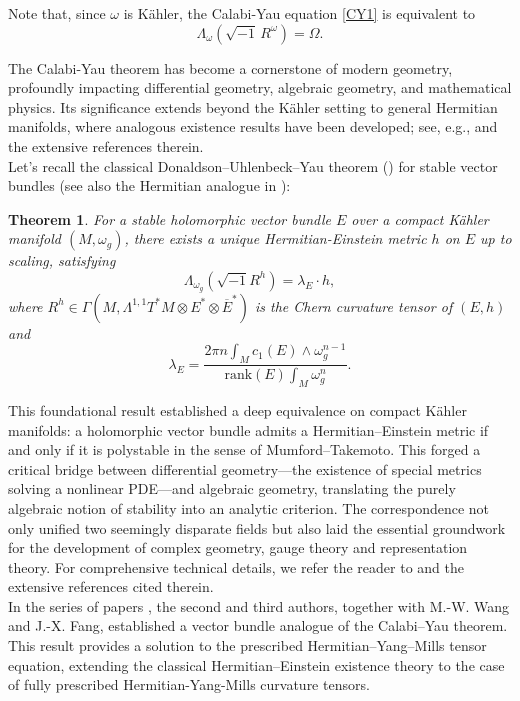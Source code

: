 \documentclass[12pt, reqno]{amsart}
\theoremstyle{plain}
\newtheorem{theorem}{Theorem}[section]
\theoremstyle{definition}
\newcommand{\sq}{\sqrt{-1}}
\renewcommand{\bar}{\overline}
\newcommand{\beq}{\begin{equation}}
\newcommand{\eeq}{\end{equation}}
\newcommand{\Om}{\Omega}
\newcommand{\ts}{\otimes}
\renewcommand{\>}{\rightarrow}
\renewcommand{\>}{\rightarrow}
\newcommand{\om}{\omega}
\renewcommand{\bar}{\overline}
\numberwithin{equation}{section} %
\begin{document}
\noindent   Note  that, since $\omega$ is K\"ahler, the Calabi-Yau equation \eqref{CY1} is equivalent to
\beq \Lambda_{\om}\left(\sqrt{-1}\, R^{\omega}\right) =\Om.\label{CY}\eeq

    \noindent The Calabi-Yau theorem  has become a cornerstone of modern geometry, profoundly impacting differential geometry, algebraic geometry, and mathematical physics. Its significance extends beyond the K\"ahler setting to general Hermitian manifolds, where analogous existence results have been developed; see, e.g., \cite{FY08, TW10, STW17} and the extensive references therein.  \\

  Let's recall the classical Donaldson--Uhlenbeck--Yau theorem (\cite{Don85, UY86, Don87}) for stable vector bundles (see also the Hermitian analogue in \cite{LY86}):  \begin{theorem}  For  a stable holomorphic vector bundle $E$ over a compact K\"ahler manifold $(M,\omega_g)$,  there exists a unique Hermitian-Einstein metric $h$ on $E$ up to scaling, satisfying
    \beq \Lambda_{\omega_g} \left(\sq R^h\right)=\lambda_E\cdot h, \label{HE} \eeq
    where $R^h\in\Gamma(M,\Lambda^{1,1}T^*M\ts E^*\ts \bar E^*)$ is the Chern curvature tensor of $(E,h)$ and
    $$\lambda_E=\frac{2\pi n\int_M c_1(E)\wedge \omega_g^{n-1}}{\mathrm{rank}(E)\int_M\omega_g^n}.$$ \end{theorem}

\noindent This foundational result established a deep equivalence on compact K\"ahler manifolds: a holomorphic vector bundle admits a Hermitian--Einstein metric if and only if it is polystable in the sense of Mumford--Takemoto. This forged a critical bridge between differential geometry---the existence of special metrics solving a nonlinear PDE---and algebraic geometry, translating the purely algebraic notion of stability into an analytic criterion. The correspondence not only unified two seemingly disparate fields but also laid the essential groundwork for the development of complex geometry, gauge theory and representation theory.  For comprehensive technical details, we refer the reader to \cite{NS65, Hit87, Sim88, Sim92} and the extensive references cited therein.\\



In the series of papers \cite{WYY26+,FWYY26+,WYY26b+}, the second and third authors, together with M.-W. Wang and J.-X. Fang, established a vector bundle analogue of the Calabi--Yau theorem. This result provides a solution to the prescribed Hermitian--Yang--Mills tensor equation, extending the classical Hermitian--Einstein existence theory to the case of fully prescribed Hermitian-Yang-Mills curvature tensors.
\end{document}
